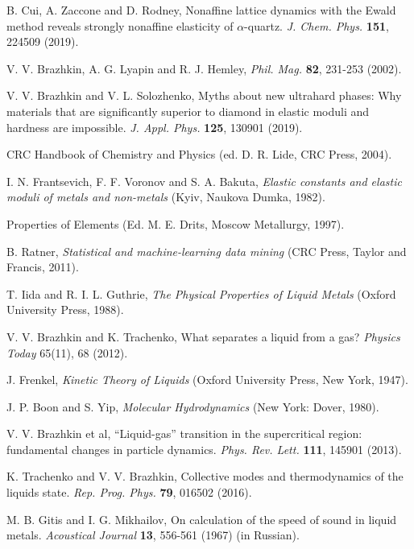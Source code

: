 \documentclass[aps,prl,groupedaddress,fleqn,twocolumn,10pt]{revtex4-1}
\begin{document}
\begin{thebibliography}{99}
 B. Cui, A. Zaccone and D. Rodney, Nonaffine lattice dynamics with the Ewald method reveals strongly nonaffine elasticity of $\alpha$-quartz.
{\it J. Chem. Phys.} {\bf 151}, 224509 (2019).

 V. V. Brazhkin, A. G. Lyapin and R. J. Hemley, {\it Phil. Mag.} {\bf 82}, 231-253 (2002).

 V. V. Brazhkin and V. L. Solozhenko, Myths about new ultrahard phases: Why materials that are significantly superior to diamond in elastic moduli and hardness are impossible. {\it J. Appl. Phys.} {\bf 125}, 130901 (2019).


 CRC Handbook of Chemistry and Physics (ed. D. R. Lide, CRC Press, 2004).

 I. N. Frantsevich, F. F. Voronov and S. A. Bakuta, {\it Elastic constants and elastic moduli of metals and non-metals} (Kyiv, Naukova Dumka, 1982).

 Properties of Elements (Ed. M. E. Drits, Moscow Metallurgy, 1997).

 B. Ratner, {\it Statistical and machine-learning data mining} (CRC Press, Taylor and Francis, 2011).

 T. Iida and R. I. L. Guthrie, {\it The Physical Properties of Liquid Metals} (Oxford University Press, 1988).

 V. V. Brazhkin and K. Trachenko, What separates a liquid from a gas? {\it Physics Today} 65(11), 68 (2012).

 J. Frenkel, {\it Kinetic Theory of Liquids} (Oxford University Press, New York, 1947).

 J. P. Boon and S. Yip, {\it Molecular Hydrodynamics} (New York: Dover, 1980).

 V. V. Brazhkin et al, ``Liquid-gas'' transition in the supercritical region: fundamental changes in particle dynamics. {\it Phys. Rev. Lett.} {\bf 111}, 145901 (2013).

 K. Trachenko and V. V. Brazhkin, Collective modes and thermodynamics of the liquids state. {\it Rep. Prog. Phys.} {\bf 79}, 016502 (2016).

 M. B. Gitis and I. G. Mikhailov, On calculation of the speed of sound in liquid metals. {\it Acoustical Journal} {\bf 13}, 556-561 (1967) (in Russian).


\end{thebibliography}
\end{document}
